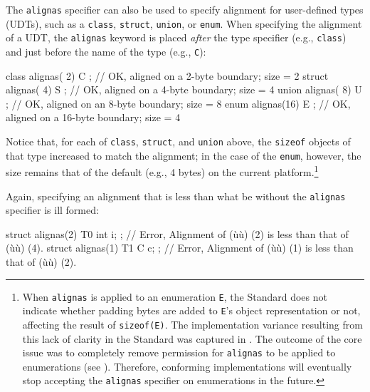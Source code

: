 The \lstinline!alignas! specifier can also be used to specify alignment for
user-defined types (UDTs), such as a \lstinline!class!, \lstinline!struct!,
\lstinline!union!, or \lstinline!enum!. When specifying the alignment of a UDT,
 the \lstinline!alignas! keyword is placed \emph{after} the
type specifier (e.g., \lstinline!class!) and just before the name of the
type (e.g., \lstinline!C!):

\begin{emcppslisting}
class  alignas( 2) C { };  // OK, aligned on a  2-byte boundary; size = 2
struct alignas( 4) S { };  // OK, aligned on a  4-byte boundary; size = 4
union  alignas( 8) U { };  // OK, aligned on an 8-byte boundary; size = 8
enum   alignas(16) E { };  // OK, aligned on a 16-byte boundary; size = 4
\end{emcppslisting}

\noindent Notice that, for each of \lstinline!class!, \lstinline!struct!, and
\lstinline!union! above, the \lstinline!sizeof! objects of that type increased
to match the alignment; in the case of the \lstinline!enum!, however, the
size remains that of the default  (e.g., 4
bytes) on the current platform.{\cprotect\footnote{When \lstinline!alignas!
is applied to an enumeration \lstinline!E!, the Standard does not
indicate whether padding bytes are added to \lstinline!E!'s object
representation or not, affecting the result of \lstinline!sizeof(E)!. The
implementation variance resulting from this lack of clarity in the
  Standard was captured in \cite{miller17}. The outcome of the core
  issue was to completely remove permission for \lstinline!alignas! to be
  applied to enumerations (see \cite{iso18a}). Therefore, conforming implementations will
  eventually stop accepting the \lstinline!alignas! specifier on
  enumerations in the future.}}

Again, specifying an alignment that is less than what be without the \lstinline!alignas! specifier is ill formed:

\begin{emcppslisting}
struct alignas(2) T0 { int i; };
    // Error, Alignment of (ù{}ù) (2) is less than that of (ù{}ù) (4).
struct alignas(1) T1 { C c; };
    // Error, Alignment of (ù{}ù) (1) is less than that of (ù{}ù) (2).
\end{emcppslisting}



